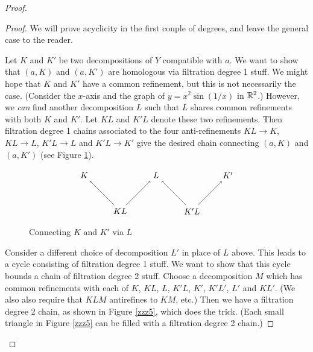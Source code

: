 \begin{proof}
\begin{proof}
We will prove acyclicity in the first couple of degrees, and 
leave the general case to the reader.

Let $K$ and $K'$ be two decompositions of $Y$ compatible with $a$.
We want to show that $(a, K)$ and $(a, K')$ are homologous via filtration degree 1 stuff.
We might hope that $K$ and $K'$ have a common refinement, but this is not necessarily
the case.
(Consider the $x$-axis and the graph of $y = x^2\sin(1/x)$ in $\mathbb{R}^2$.)
However, we {\it can} find another decomposition $L$ such that $L$ shares common
refinements with both $K$ and $K'$.
Let $KL$ and $K'L$ denote these two refinements.
Then filtration degree 1 chains associated to the four anti-refinements
$KL\to K$, $KL\to L$, $K'L\to L$ and $K'L\to K'$
give the desired chain connecting $(a, K)$ and $(a, K')$
(see Figure \ref{zzz4}).

\begin{figure}[!ht]
\begin{equation*}
\begin{tikzpicture}
\foreach \x/\label in {-3/K, 0/L, 3/K'} {
	\node(\label) at (\x,0) {$\label$};
}
\foreach \x/\la/\lb in {-1.5/K/L, 1.5/K'/L} {
	\node(\la \lb) at (\x,-1.5) {$\la \lb$};
	\draw[->] (\la \lb) -- (\la);
	\draw[->] (\la \lb) -- (\lb); 
}
\end{tikzpicture}
\end{equation*}
\caption{Connecting $K$ and $K'$ via $L$}
\label{zzz4}
\end{figure}

Consider a different choice of decomposition $L'$ in place of $L$ above.
This leads to a cycle consisting of filtration degree 1 stuff.
We want to show that this cycle bounds a chain of filtration degree 2 stuff.
Choose a decomposition $M$ which has common refinements with each of 
$K$, $KL$, $L$, $K'L$, $K'$, $K'L'$, $L'$ and $KL'$.
(We also also require that $KLM$ antirefines to $KM$, etc.)
Then we have a filtration degree 2 chain, as shown in Figure \ref{zzz5}, which does the trick.
(Each small triangle in Figure \ref{zzz5} can be filled with a filtration degree 2 chain.)


\end{proof}
\end{proof}

